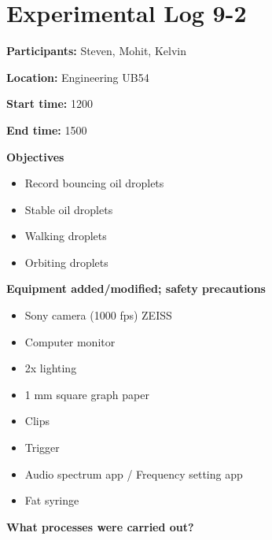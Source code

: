 
\section{Experimental Log 9-2}

\textbf{Participants:} Steven, Mohit, Kelvin

\textbf{Location:} Engineering UB54

\textbf{Start time:} 1200

\textbf{End time:} 1500


\bigskip

\textbf{Objectives}

\begin{itemize}
\item Record bouncing oil droplets
\item Stable oil droplets
\item Walking droplets
\item Orbiting droplets
\end{itemize}
\bigskip

\textbf{Equipment added/modified; safety precautions}

\begin{itemize}
\item Sony camera (1000 fps) ZEISS 
\item Computer monitor
\item 2x lighting
\item 1 mm square graph paper
\item Clips
\item Trigger
\item Audio spectrum app / Frequency setting app
\item Fat syringe
\end{itemize}
\bigskip

\textbf{What processes were carried out?}

